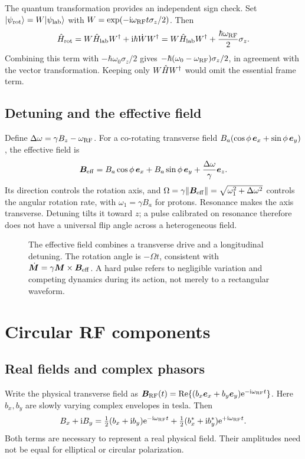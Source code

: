 The quantum transformation provides an independent sign check.
Set $\lvert \psi_{\rm rot}\rangle=W\lvert \psi_{\rm lab}\rangle$ with
$W=\exp(-\mathrm{i}\omega_{\rm RF}t\sigma_z/2)$.
Then
\begin{equation}
 \hat{H}_{\rm rot}=W\hat{H}_{\rm lab}W^\dagger+
                      \mathrm{i}\hbar\dot W W^\dagger
                =W\hat{H}_{\rm lab}W^\dagger+
                      \frac{\hbar\omega_{\rm RF}}2\sigma_z .
 \label{eq:04:frame}
\end{equation}
Combining this term with $-\hbar\omega_0\sigma_z/2$ gives
$-\hbar(\omega_0-\omega_{\rm RF})\sigma_z/2$, in agreement with
the vector transformation. Keeping only $W\hat{H} W^\dagger$ would
omit the essential frame term.

\subsection{Detuning and the effective field}
Define $\Delta\omega=\gamma B_z-\omega_{\rm RF}$.
For a co-rotating transverse field
$B_a(\cos\phi\,\bm{e}_x+\sin\phi\,\bm{e}_y)$, the effective field is
\begin{equation}
 \bm{B}_{\rm eff}
  =B_a\cos\phi\,\bm{e}_x+B_a\sin\phi\,\bm{e}_y+
               \frac{\Delta\omega}{\gamma}\bm{e}_z .
 \label{eq:04:effective}
\end{equation}
Its direction controls the rotation axis, and
$\Omega=\gamma\lVert\bm{B}_{\rm eff}\rVert
=\sqrt{\omega_1^2+\Delta\omega^2}$ controls the angular rotation rate,
with $\omega_1=\gamma B_a$ for protons.
Resonance makes the axis transverse. Detuning tilts it toward $z$;
a pulse calibrated on resonance therefore does not have a universal
flip angle across a heterogeneous field.

\begin{figure}[tb]
 \centering
 \caption{The effective field combines a transverse drive and a longitudinal
 detuning. The rotation angle is $-\Omega t$, consistent with
 $\dot{\bm{M}}=\gamma\bm{M}\times\bm{B}_{\rm eff}$.
 A hard pulse refers to negligible variation and competing dynamics
 during its action, not merely to a rectangular waveform.}
 \label{fig:04:effective}
\end{figure}

\section{Circular RF components}
\label{sec:04:circular-rf-components}
\subsection{Real fields and complex phasors}
Write the physical transverse field as
$\bm{B}_{\rm RF}(t)=\operatorname{Re}\{
(b_x\bm{e}_x+b_y\bm{e}_y)\mathrm{e}^{-\mathrm{i}\omega_{\rm RF}t}\}$.
Here $b_x,b_y$ are slowly varying complex envelopes in tesla.
Then
\[
 B_x+\mathrm{i} B_y=
 \tfrac12(b_x+\mathrm{i} b_y)\mathrm{e}^{-\mathrm{i}\omega_{\rm RF}t}
 +\tfrac12(b_x^*+\mathrm{i} b_y^*)\mathrm{e}^{+\mathrm{i}\omega_{\rm RF}t}.
\]
Both terms are necessary to represent a real physical field.
Their amplitudes need not be equal for elliptical or circular polarization.

